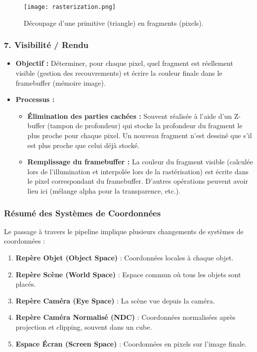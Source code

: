\documentclass{article}
\begin{document}
\begin{figure}[H]
\centering
\texttt{[image: rasterization.png]}
\caption{Découpage d'une primitive (triangle) en fragments (pixels).}
\label{fig:rasterization}
\end{figure}

\subsubsection{7. Visibilité / Rendu}
\begin{itemize}
    \item \textbf{Objectif :} Déterminer, pour chaque pixel, quel fragment est réellement visible (gestion des recouvrements) et écrire la couleur finale dans le framebuffer (mémoire image).
    \item \textbf{Processus :}
    \begin{itemize}
        \item \textbf{Élimination des parties cachées :} Souvent réalisée à l'aide d'un Z-buffer (tampon de profondeur) qui stocke la profondeur du fragment le plus proche pour chaque pixel. Un nouveau fragment n'est dessiné que s'il est plus proche que celui déjà stocké.
        \item \textbf{Remplissage du framebuffer :} La couleur du fragment visible (calculée lors de l'illumination et interpolée lors de la rastérisation) est écrite dans le pixel correspondant du framebuffer. D'autres opérations peuvent avoir lieu ici (mélange alpha pour la transparence, etc.).
    \end{itemize}
\end{itemize}

\subsubsection{Résumé des Systèmes de Coordonnées}
Le passage à travers le pipeline implique plusieurs changements de systèmes de coordonnées :
\begin{enumerate}
    \item \textbf{Repère Objet (Object Space)} : Coordonnées locales à chaque objet.
    \item \textbf{Repère Scène (World Space)} : Espace commun où tous les objets sont placés.
    \item \textbf{Repère Caméra (Eye Space)} : La scène vue depuis la caméra.
    \item \textbf{Repère Caméra Normalisé (NDC)} : Coordonnées normalisées après projection et clipping, souvent dans un cube.
    \item \textbf{Espace Écran (Screen Space)} : Coordonnées en pixels sur l'image finale.
\end{enumerate}
\end{document}
